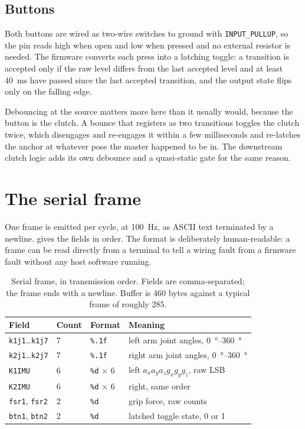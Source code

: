 \subsection{Buttons}

Both buttons are wired as two-wire switches to ground with
\texttt{INPUT\_PULLUP}, so the pin reads high when open and low when pressed
and no external resistor is needed. The firmware converts each press into a
latching toggle: a transition is accepted only if the raw level differs from
the last accepted level and at least \SI{40}{\milli\second} have passed since
the last accepted transition, and the output state flips only on the falling
edge.

Debouncing at the source matters more here than it usually would, because the
button is the clutch. A bounce that registers as two transitions toggles the
clutch twice, which disengages and re-engages it within a few milliseconds and
re-latches the anchor at whatever pose the master happened to be in. The
downstream clutch logic adds its own debounce and a quasi-static gate for the
same reason.

\section{The serial frame}

One frame is emitted per cycle, at \SI{100}{\hertz}, as ASCII text terminated
by a newline.  gives the fields in order. The format is
deliberately human-readable: a frame can be read directly from a terminal to
tell a wiring fault from a firmware fault without any host software running.

\begin{table}[htbp]
  \centering
  \caption{Serial frame, in transmission order. Fields are comma-separated;
  the frame ends with a newline. Buffer is \num{460} bytes against a typical
  frame of roughly \num{285}.}
  \label{tab:frame}
  \begin{tabular}{@{}llll@{}}
    \toprule
    Field & Count & Format & Meaning \\
    \midrule
    \texttt{k1j1}\ldots\texttt{k1j7} & 7 & \texttt{\%.1f}
      & left arm joint angles, \SIrange{0}{360}{\degree} \\
    \texttt{k2j1}\ldots\texttt{k2j7} & 7 & \texttt{\%.1f}
      & right arm joint angles, \SIrange{0}{360}{\degree} \\
    \texttt{K1IMU} & 6 & \texttt{\%d} $\times$ 6
      & left $a_x a_y a_z g_x g_y g_z$, raw LSB \\
    \texttt{K2IMU} & 6 & \texttt{\%d} $\times$ 6
      & right, same order \\
    \texttt{fsr1}, \texttt{fsr2} & 2 & \texttt{\%d}
      & grip force, raw counts \\
    \texttt{btn1}, \texttt{btn2} & 2 & \texttt{\%d}
      & latched toggle state, \num{0} or \num{1} \\
    \bottomrule
  \end{tabular}
\end{table}

